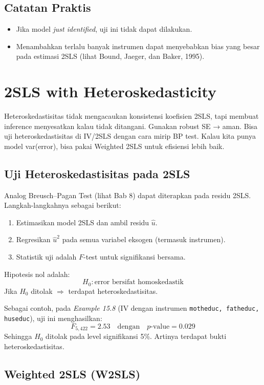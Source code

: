 \documentclass[]{article}
\begin{document}
\subsection*{Catatan Praktis}
\begin{itemize}
    \item Jika model \textit{just identified}, uji ini tidak dapat dilakukan.
    \item Menambahkan terlalu banyak instrumen dapat menyebabkan bias yang besar 
    pada estimasi 2SLS (lihat Bound, Jaeger, dan Baker, 1995).
\end{itemize}

\section{2SLS with Heteroskedasticity}
Heteroskedastisitas tidak mengacaukan konsistensi koefisien 2SLS, tapi membuat inference menyesatkan kalau tidak ditangani. Gunakan robust SE → aman.
Bisa uji heteroskedastisitas di IV/2SLS dengan cara mirip BP test. Kalau kita punya model var(error), bisa pakai Weighted 2SLS untuk efisiensi lebih baik.
\subsection*{Uji Heteroskedastisitas pada 2SLS}

Analog Breusch--Pagan Test (lihat Bab 8) dapat diterapkan pada residu 2SLS. 
Langkah-langkahnya sebagai berikut:

\begin{enumerate}
    \item Estimasikan model 2SLS dan ambil residu $\hat{u}$.
    \item Regresikan $\hat{u}^2$ pada semua variabel eksogen (termasuk instrumen).
    \item Statistik uji adalah $F$-test untuk signifikansi bersama.
\end{enumerate}

Hipotesis nol adalah:
\[
H_0 : \text{error bersifat homoskedastik}
\]
Jika $H_0$ ditolak $\Rightarrow$ terdapat heteroskedastisitas.

Sebagai contoh, pada \textit{Example 15.8} (IV dengan instrumen \texttt{motheduc, fatheduc, huseduc}), 
uji ini menghasilkan:
\[
F_{5,422} = 2.53 \quad \text{dengan} \quad p\text{-value} = 0.029
\]
Sehingga $H_0$ ditolak pada level signifikansi 5\%. Artinya terdapat bukti heteroskedastisitas.

\subsection*{Weighted 2SLS (W2SLS)}
\end{document}
